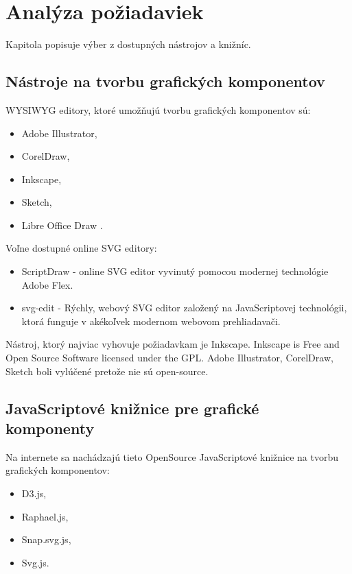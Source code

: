 \chapter{Analýza požiadaviek}
Kapitola popisuje výber z dostupných nástrojov a knižníc. 

\section{Nástroje na tvorbu grafických komponentov}

\acs{WYSIWYG} editory, ktoré umožňujú tvorbu grafických komponentov sú: 

\begin{itemize}
\item Adobe Illustrator, 
\item CorelDraw, 
\item Inkscape,
\item Sketch, 
\item Libre Office Draw .
\end{itemize}

Voľne dostupné online SVG editory: 
\begin{itemize}
	\item ScriptDraw - online SVG editor vyvinutý pomocou modernej technológie Adobe Flex.
	
	\item svg-edit - Rýchly, webový SVG editor založený na JavaScriptovej technológii, ktorá funguje v akékoľvek modernom webovom prehliadavači. 
	
\end{itemize}



Nástroj, ktorý najviac vyhovuje  požiadavkam je Inkscape. Inkscape is Free and Open Source Software licensed under the GPL.
Adobe Illustrator, CorelDraw, Sketch boli vylúčené pretože nie sú open-source.  




\section{JavaScriptové knižnice pre grafické komponenty}
Na internete sa nachádzajú tieto OpenSource JavaScriptové knižnice na tvorbu grafických komponentov: 
\begin{itemize}
	\item \acs{D3}.js, 
	\item Raphael.js, 
	\item Snap.svg.js,  
	\item Svg.js. 
\end{itemize}



